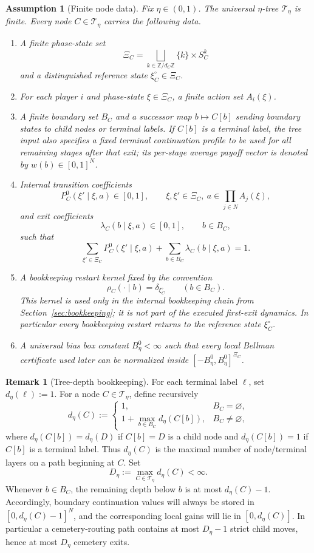 \documentclass[12pt]{article}
\newtheorem{assumption}[theorem]{Assumption}
\theoremstyle{definition}
\newtheorem{remark}[theorem]{Remark}
\newcommand{\1}{\mathbf{1}}
\newcommand{\cT}{\mathcal{T}}
\begin{document}
\begin{assumption}[Finite node data]
\label{ass:node-data}
Fix $\eta\in(0,1)$. The universal $\eta$-tree $\cT_\eta$ is finite. Every node
$C\in \cT_\eta$ carries the following data.
\begin{enumerate}[label=\textnormal{(D\arabic*)},leftmargin=2.8em]
\item A finite phase-state set
\[
\Xi_C=\bigsqcup_{k\in\mathbb Z/d_C\mathbb Z}\{k\}\times S_C^k
\]
and a distinguished reference state $\xi_C^\circ\in\Xi_C$.
\item For each player $i$ and phase-state $\xi\in\Xi_C$, a finite action set
$A_i(\xi)$.
\item A finite boundary set $B_C$ and a successor map $b\mapsto C[b]$ sending
boundary states to child nodes or terminal labels. If $C[b]$ is a terminal
label, the tree input also specifies a fixed terminal continuation profile to be
used for all remaining stages after that exit; its per-stage average payoff
vector is denoted by $w(b)\in[0,1]^N$.
\item Internal transition coefficients
\[
P_C^0(\xi'\mid \xi,a)\in[0,1],
\qquad \xi,\xi'\in \Xi_C,
\ a\in \prod_{j\in N}A_j(\xi),
\]
and exit coefficients
\[
\lambda_C(b\mid \xi,a)\in[0,1],
\qquad b\in B_C,
\]
such that
\[
\sum_{\xi'\in\Xi_C}P_C^0(\xi'\mid \xi,a)+\sum_{b\in B_C}\lambda_C(b\mid\xi,a)=1.
\]
\item A bookkeeping restart kernel fixed by the convention
\[
\rho_C(\cdot\mid b)=\delta_{\xi_C^\circ}
\qquad (b\in B_C).
\]
This kernel is used only in the internal bookkeeping chain from
Section~\ref{sec:bookkeeping}; it is not part of the executed first-exit
dynamics. In particular every bookkeeping restart returns to the reference
state $\xi_C^\circ$.
\item A universal bias box constant $B_\eta^0<\infty$ such that every local
Bellman certificate used later can be normalized inside
$[-B_\eta^0,B_\eta^0]^{\Xi_C}$.
\end{enumerate}
\end{assumption}

\begin{remark}[Tree-depth bookkeeping]
\label{rem:tree-depth}
For each terminal label $\ell$, set $d_\eta(\ell):=1$. For a node $C\in\cT_\eta$,
define recursively
\[
d_\eta(C)
:=
\begin{cases}
1, & B_C=\varnothing,\\[0.3em]
1+\max_{b\in B_C} d_\eta(C[b]), & B_C\neq \varnothing,
\end{cases}
\]
where $d_\eta(C[b])=d_\eta(D)$ if $C[b]=D$ is a child node and
$d_\eta(C[b])=1$ if $C[b]$ is a terminal label. Thus $d_\eta(C)$ is the maximal
number of node/terminal layers on a path beginning at $C$. Set
\[
D_\eta:=\max_{C\in\cT_\eta} d_\eta(C)<\infty.
\]
Whenever $b\in B_C$, the remaining depth below $b$ is at most $d_\eta(C)-1$.
Accordingly, boundary continuation values will always be stored in
$[0,d_\eta(C)-1]^N$, and the corresponding local gains will lie in
$[0,d_\eta(C)]$. In particular a cemetery-routing path contains at most
$D_\eta-1$ strict child moves, hence at most $D_\eta$ cemetery exits.
\end{remark}
\end{document}
